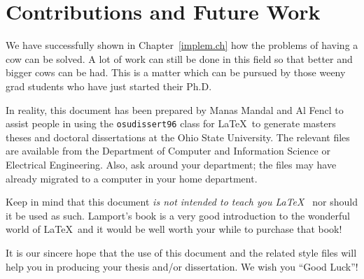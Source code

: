 \chapter{Contributions and Future Work}
\label{end.ch}

We have successfully shown in Chapter~\ref{implem.ch} how the problems
of having a cow can be solved. A lot of work can still be done in this
field so that better and bigger cows can be had. This is a matter
which can be pursued by those weeny grad students who have just
started their Ph.D. 

In reality, this document has been prepared by Manas Mandal and Al
Fencl to assist people in using the {\tt osudissert96} class for
\LaTeX\ to generate masters theses and doctoral dissertations at the Ohio
State University. The relevant files are available from the Department
of Computer and Information Science or Electrical Engineering.  Also, ask
around your department; the files may have already migrated to a computer
in your home department.

Keep in mind that this document {\em is not intended to teach you
\LaTeX\ } nor should it be used as such.  Lamport's book
\cite{lamport:latex} is a very good introduction to the wonderful
world of \LaTeX\ and it would be well worth your while to purchase
that book!

It is our sincere hope that the use of this document and the related
style files will help you in producing your thesis and/or
dissertation. We wish you ``Good Luck''!
